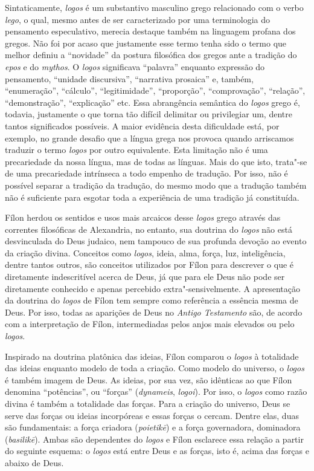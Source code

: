 Sintaticamente, \emph{logos} é um substantivo masculino grego
relacionado com o verbo \emph{lego}, o qual, mesmo antes de
ser caracterizado por uma terminologia do pensamento
especulativo, merecia destaque também na linguagem profana dos
gregos. Não foi por acaso que justamente esse termo tenha sido o
termo que melhor definiu a ``novidade'' da postura filosófica dos
gregos ante a tradição do \emph{epos} e do \emph{mythos}. O
\emph{logos} significava ``palavra'' enquanto expressão do
pensamento, ``unidade discursiva'', ``narrativa prosaica'' e,
também, ``enumeração'', ``cálculo'', ``legitimidade'', ``proporção'',
``comprovação'', ``relação'', ``demonstração'', ``explicação'' etc. Essa
abrangência semântica do \emph{logos} grego é, todavia,
justamente o que torna tão difícil delimitar ou privilegiar um,
dentre tantos significados possíveis. A maior evidência desta
dificuldade está, por exemplo, no grande desafio que a língua
grega nos provoca quando arriscamos traduzir o termo
\emph{logos} por outro equivalente. Esta limitação não é uma
precariedade da nossa língua, mas de todas as línguas. Mais do
que isto, trata"-se de uma precariedade intrínseca a todo empenho
de tradução. Por isso, não é possível separar a tradição da
tradução, do mesmo modo que a tradução também não é suficiente
para esgotar toda a experiência de uma tradição já constituída.

Fílon herdou os sentidos e usos mais arcaicos desse \emph{logos}
grego através das correntes filosóficas de Alexandria, no
entanto, sua doutrina do \emph{logos} não está desvinculada do
Deus judaico, nem tampouco de sua profunda devoção ao evento da
criação divina. Conceitos como \emph{logos}, ideia, alma,
força, luz, inteligência, dentre tantos outros, são conceitos
utilizados por Fílon para descrever o que é diretamente
indescritível acerca de Deus, já que para ele Deus não pode ser
diretamente conhecido e apenas percebido extra"-sensivelmente. A
apresentação da doutrina do \emph{logos} de Fílon tem sempre
como referência a essência mesma de Deus. Por isso, todas as
aparições de Deus no \emph{Antigo Testamento} são, de acordo
com a interpretação de Fílon, intermediadas pelos anjos mais
elevados ou pelo \emph{logos}.

Inspirado na doutrina platônica das ideias, Fílon comparou o
\emph{logos} à totalidade das ideias enquanto modelo de toda a
criação. Como modelo do universo, o \emph{logos} é também
imagem de Deus. As ideias, por sua vez, são idênticas ao que
Fílon denomina ``potências'', ou ``forças'' (\emph{dynameis},
\emph{logoi}). Por isso, o \emph{logos} como razão divina é
também a totalidade das forças. Para a criação do universo, Deus
se serve das forças ou ideias incorpóreas e essas forças o
cercam. Dentre elas, duas são fundamentais: a força criadora
(\emph{poietik\={e}}) e a força governadora, dominadora
(\emph{basilik\={e}}). Ambas são dependentes do \emph{logos} e
Fílon esclarece essa relação a partir do seguinte esquema: o
\emph{logos} está entre Deus e as forças, isto é, acima das
forças e abaixo de Deus.

